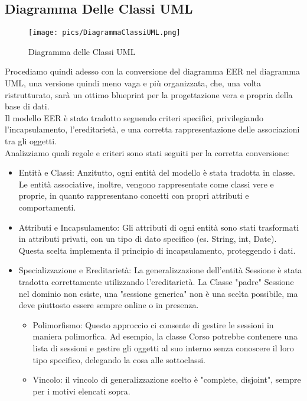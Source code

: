 \documentclass[a4paper, 12pt]{article}
\begin{document}
    \subsection{Diagramma Delle Classi UML}
    \begin{figure}[H]
        \centering
        \texttt{[image: pics/DiagrammaClassiUML.png]}
        \caption{\label{fig:DiagrammaClassiUML}Diagramma delle Classi UML}
    \end{figure}
    Procediamo quindi adesso con la conversione del diagramma EER nel diagramma UML, una versione quindi meno vaga e più organizzata, che, una volta ristrutturato, sarà un ottimo blueprint per la progettazione vera e propria della base di dati.\\[0.3cm]
    Il modello EER è stato tradotto seguendo criteri specifici, privilegiando l'incapsulamento, l'ereditarietà, e una corretta rappresentazione delle associazioni tra gli oggetti.\\[0.3cm]
    Analizziamo quali regole e criteri sono stati seguiti per la corretta conversione:
    \begin{itemize}
        \item Entità e Classi: Anzitutto, ogni entità del modello è stata tradotta in classe. Le entità associative, inoltre, vengono rappresentate come classi vere e proprie, in quanto rappresentano concetti con propri attributi e comportamenti.
        \item Attributi e Incapsulamento: Gli attributi di ogni entità sono stati trasformati in attributi privati, con un tipo di dato specifico (es. String, int, Date). Questa scelta implementa il principio di incapsulamento, proteggendo i dati.
        \item Specializzazione e Ereditarietà: La generalizzazione dell'entità Sessione è stata tradotta correttamente utilizzando l'ereditarietà. La Classe "padre" Sessione nel dominio non esiste, una "sessione generica" non è una scelta possibile, ma deve piuttosto essere sempre online o in presenza.
            \begin{itemize}
                \item Polimorfismo: Questo approccio ci consente di gestire le sessioni in maniera polimorfica. Ad esempio, la classe Corso potrebbe contenere una lista di sessioni e gestire gli oggetti al suo interno senza conoscere il loro tipo specifico, delegando la cosa alle sottoclassi.
                \item Vincolo: il vincolo di generalizzazione scelto è "{complete, disjoint}", sempre per i motivi elencati sopra.
            \end{itemize}
    \end{itemize}
\end{document}
